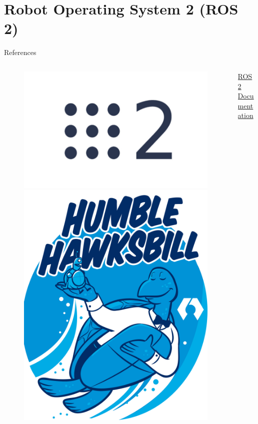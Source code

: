 \part{Robot Operating System 2 (ROS 2)}

\begin{frame}{References}
    \begin{columns}[c]
        \begin{column}{.45\textwidth}
            \begin{figure}
                \centering
                \includegraphics[scale=0.15]{img/ros2/ros2_logo.jpeg}
                \includegraphics[scale=0.15]{img/ros2/ros2_humble.png}
            \end{figure}
        \end{column}
        \begin{column}{.45\textwidth}
            \centering
            \small
            \href{https://docs.ros.org/en/humble/}{ROS 2 Documentation}


\end{column}
\end{columns}
\end{frame}
